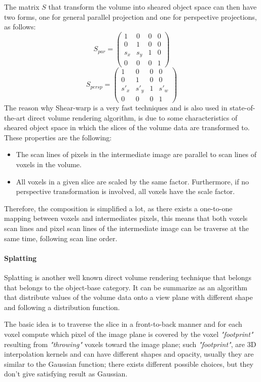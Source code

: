\documentclass[12pt,a4paper]{extarticle}
\newcommand{\linespace}{\vspace{8pt}}
\begin{document}
The matrix $S$ that transform the volume into sheared object space can then have two forms, one for general parallel projection and one for perspective projections, as follows: 
\[
S_{par}
=
\begin{pmatrix}
1 & 0 & 0 & 0\\
0 & 1 & 0 & 0\\
s_{x}&s_{y}& 1 & 0\\
0& 0 &0 &1
\end{pmatrix}
\]
\[
S_{persp}
=
\begin{pmatrix}
1 & 0 & 0 & 0\\
0 & 1 & 0 & 0\\
s'_{x}&s'_{y}& 1 & s'_{w}\\
0& 0 &0 &1
\end{pmatrix}
\]
The reason why Shear-warp is a very fast techniques and is also used in state-of-the-art direct volume rendering algorithm, is due to some characteristics of sheared object space in which the slices of the volume data are transformed to.
These properties are the following:
\begin{itemize}
\item The scan lines \cite{jack_tsatsulin_2002} of pixels in the intermediate image are parallel to scan lines of voxels in the volume.
\item All voxels in a given slice are scaled by the same factor. Furthermore, if no perspective transformation is involved, all voxels have the scale factor.
\end{itemize}
Therefore, the composition is simplified a lot, as there exists a one-to-one mapping between voxels and intermediates pixels, this means that both voxels scan lines and pixel scan lines of the intermediate image can be traverse at the same time, following scan line order.

\paragraph{Splatting} Splatting is another well known direct volume rendering technique that belongs that belongs to the object-base category. It can be summarize as an algorithm that distribute values of the volume data onto a view plane with different shape and following a distribution function.
\linespace

The basic idea is to traverse the slice in a front-to-back manner and for each voxel compute which pixel of the image plane is covered by the voxel \textit{"footprint"} resulting from \textit{"throwing"} voxels toward the image plane; such \textit{"footprint"}, are 3D interpolation kernels and can have different shapes and opacity, usually they are similar to the Gaussian function; there exists different possible choices, but they don't give satisfying result as Gaussian.
\end{document}
